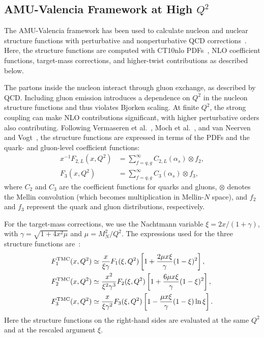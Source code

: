 \documentclass[10pt,twocolumn]{article}
\begin{document}
\subsection{AMU-Valencia Framework at High $Q^2$}
The AMU-Valencia framework has been used to calculate nucleon and
nuclear structure functions with perturbative and nonperturbative QCD
corrections~\cite{Haider2016,Zaidi2020}. Here, the structure functions are computed
with CT10nlo PDFs~\cite{CT10}, NLO coefficient functions, target-mass
corrections, and higher-twist contributions as described below.

The partons inside the nucleon interact through gluon exchange, as
described by QCD. Including gluon emission introduces a dependence on
$Q^2$ in the nucleon structure functions and thus violates Bjorken
scaling. At finite $Q^2$, the strong coupling can make NLO contributions
significant, with higher perturbative orders also contributing. Following
Vermaseren et al.~\cite{Vermaseren2005}, Moch et al.~\cite{Moch2009},
and van Neerven and Vogt~\cite{VanNeervenVogt},
the structure functions are expressed in terms of the PDFs and the
quark- and gluon-level coefficient functions:
\begin{equation}
\begin{aligned}
  x^{-1}F_{2,L}(x,Q^2)
    &= \sum_{f=q,g}^{\infty} C_{2,L}(\alpha_s)\otimes f_2,\\
  F_3(x,Q^2)
    &= \sum_{f=q,g}^{\infty} C_3(\alpha_s)\otimes f_3,
\end{aligned}
\label{eq:nlo-coeff}
\end{equation}
where $C_2$ and $C_3$ are the coefficient functions for quarks and
gluons, $\otimes$ denotes the Mellin convolution (which becomes
multiplication in Mellin-$N$ space), and $f_2$ and $f_3$ represent the
quark and gluon distributions, respectively.

For the target-mass corrections, we use the Nachtmann variable
$\xi=2x/(1+\gamma)$, with
$\gamma=\sqrt{1+4x^2\mu}$ and $\mu=M_N^2/Q^2$. The expressions used
for the three structure functions are~\cite{Schienbein}:
\begin{equation}
\begin{aligned}
  F_1^{\rm TMC}(x,Q^2)
    &\simeq \frac{x}{\xi\gamma}F_1(\xi,Q^2)
       \left[1+\frac{2\mu x\xi}{\gamma}(1-\xi)^2\right],\\
  F_2^{\rm TMC}(x,Q^2)
    &\simeq \frac{x^2}{\xi^2\gamma^3}F_2(\xi,Q^2)
       \left[1+\frac{6\mu x\xi}{\gamma}(1-\xi)^2\right],\\
  F_3^{\rm TMC}(x,Q^2)
    &\simeq \frac{x}{\xi\gamma^2}F_3(\xi,Q^2)
       \left[1-\frac{\mu x\xi}{\gamma}(1-\xi)\ln\xi\right].
\end{aligned}
\label{eq:tmc}
\end{equation}
Here the structure functions on the right-hand sides are evaluated at
the same $Q^2$ and at the rescaled argument $\xi$.
\end{document}
